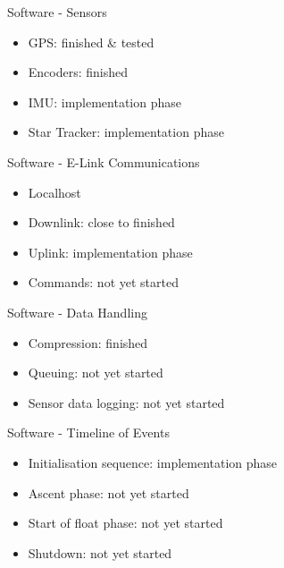 \documentclass[11pt, aspectratio=169]{beamer}
\begin{document}
\begin{frame}[c]{Software - Sensors}
    \begin{itemize}
        \item GPS: finished \& tested
        \item Encoders: finished
        \item IMU: implementation phase
        \item Star Tracker: implementation phase
    \end{itemize}
\end{frame}

\begin{frame}[c]{Software - E-Link Communications}
    \begin{itemize}
        \item Localhost
        \item Downlink: close to finished
        \item Uplink: implementation phase
        \item Commands: not yet started
    \end{itemize}
\end{frame}

\begin{frame}[c]{Software - Data Handling}
    \begin{itemize}
        \item Compression: finished
        \item Queuing: not yet started
        \item Sensor data logging: not yet started
    \end{itemize}
\end{frame}

\begin{frame}[c]{Software - Timeline of Events}
    \begin{itemize}
        \item Initialisation sequence: implementation phase
        \item Ascent phase: not yet started
        \item Start of float phase: not yet started
        \item Shutdown: not yet started
    \end{itemize}
\end{frame}
\end{document}
